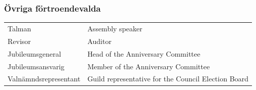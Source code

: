 \documentclass{dsekprotokoll}
\begin{document}
\subsubsection*{Övriga förtroendevalda}
\vspace{12pt}
\begin{center}
    \begin{tabular}{R{7cm}|L{7cm}}
        Talman & Assembly speaker\\
        Revisor & Auditor\\
        Jubileumsgeneral & Head of the Anniversary Committee\\
        Jubileumsansvarig & Member of the Anniversary Committee\\
        Valnämndsrepresentant & Guild representative for the Council Election Board\\
    \end{tabular}
\end{center}

%
%
\end{document}
